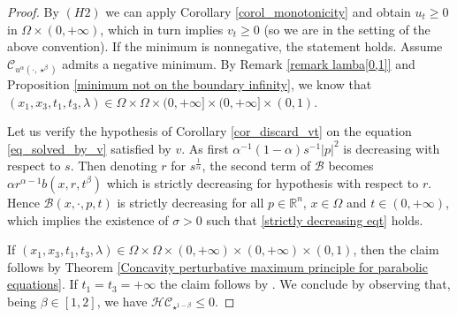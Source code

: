 \documentclass[11pt, reqno]{amsart}
\theoremstyle{definition}
\numberwithin{equation}{section}
\newcommand{\R}{\mathbb{R}}
\newcommand{\mc}[1]{\mathcal{#1}}
\begin{document}
\begin{proof}
	By \hyperlink{H2}{\( (H2) \)} we can apply Corollary \ref{corol_monotonicity} and obtain 	$u_t\geq 0$ in $ \Omega\times (0,+\infty)$, 
	which in turn implies $v_t\geq 0$ (so we are in the setting of the above convention).
 If the minimum is nonnegative, the statement holds. 
	 Assume $\mathcal{C}_{u^\alpha(\cdot, \star^{\beta})}$ admits a negative minimum. 
	 By Remark \ref{remark lamba[0,1]} and Proposition \ref{minimum not on the boundary infinity}, we know that $(x_1,x_3,t_1,t_3,\lambda)\in \Omega\times \Omega\times (0,+\infty]\times (0,+\infty]\times (0,1)$. 	 
		
	 Let us verify the hypothesis of Corollary \ref{cor_discard_vt} on the equation \eqref{eq_solved_by_v} satisfied by $v$.
	 As first $\alpha^{-1}(1-\alpha)s^{-1}|p|^2$ is decreasing with respect to $s$. Then denoting $r$ for $s^{\frac{1}{\alpha}}$, 
	 the second term of $\mathscr{B}$ becomes $\alpha r^{\alpha-1}b(x,r,t^{\beta})$ which is strictly decreasing for hypothesis with respect to $r$. Hence $\mathscr{B}(x,\cdot,p,t)$ is strictly decreasing for all $p\in \R^n$, $x\in \Omega$ and $t \in (0,+\infty)$, which implies the existence of $\sigma>0$ such that \eqref{strictly decreasing eqt} holds. 

	If $(x_1,x_3,t_1,t_3,\lambda)\in \Omega\times \Omega\times (0,+\infty)\times (0,+\infty)\times (0,1)$, then the claim follows by Theorem \ref{Concavity perturbative maximum principle for parabolic equations}.
	 If $t_1=t_3=+\infty$ the claim follows by \cite[Lemma 2.9]{BuSq19}. 
	We conclude by observing that, being $\beta \in [1,2]$, we have $\mc{HC}_{\star^{1-\beta}} \leq 0$.
\end{proof}
\end{document}
